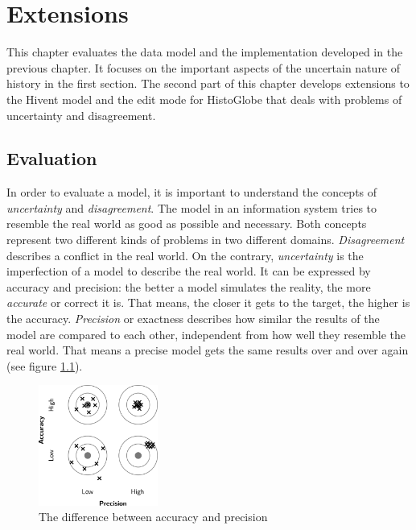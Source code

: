 
\chapter{Extensions} %
\label{cha:extensions}

This chapter evaluates the data model and the implementation developed in the previous chapter. It focuses on the important aspects of the uncertain nature of history in the first section. The second part of this chapter develops extensions to the Hivent model and the edit mode for HistoGlobe that deals with problems of uncertainty and disagreement.

\section{Evaluation} %
\label{sec:evaluation}

In order to evaluate a model, it is important to understand the concepts of \emph{uncertainty} and \emph{disagreement}. The model in an information system tries to resemble the real world as good as possible and necessary. Both concepts represent two different kinds of problems in two different domains.
\emph{Disagreement} describes a conflict in the real world. On the contrary, \emph{uncertainty} is the imperfection of a model to describe the real world. It can be expressed by accuracy and precision: the better a model simulates the reality, the more \emph{accurate} or correct it is. That means, the closer it gets to the target, the higher is the accuracy. \emph{Precision} or exactness describes how similar the results of the model are compared to each other, independent from how well they resemble the real world. That means a precise model gets the same results over and over again (see figure \ref{fig:accuracy_precision}).

\begin{figure}[ht]
  \vspace{1em}
  \centering
  \includegraphics[width = 0.35\textwidth]{graphics/extensions/accuracy_precision}
  \caption{The difference between accuracy and precision}
  \label{fig:accuracy_precision}
\end{figure}


